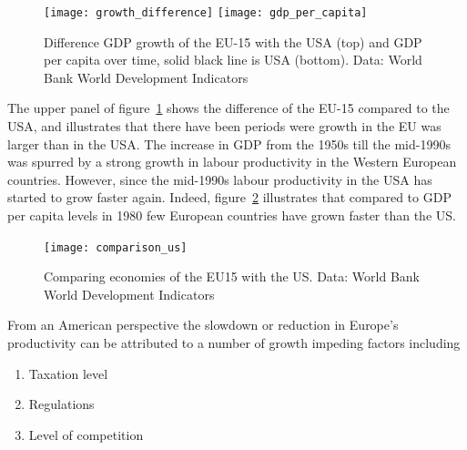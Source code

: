 \documentclass{tufte-handout}
\begin{document}
\begin{figure} \centering
    \texttt{[image: growth\_difference]}
    \texttt{[image: gdp\_per\_capita]}
    \caption{Difference GDP growth of the EU-15 with the USA (top) and GDP per capita over time, solid black line is USA (bottom). Data: World Bank World Development Indicators}
    \label{fig:growth}
  \end{figure}

The upper panel of figure~\ref{fig:growth} shows the difference of the EU-15 compared to the USA, and illustrates that there have been periods were growth in the EU was larger than in the USA. 
The increase in GDP from the 1950s till the mid-1990s was spurred by a strong growth in labour productivity in the Western European countries.
However, since the mid-1990s labour productivity in the USA has started to grow faster again. 
Indeed, figure~\ref{fig:comparison} illustrates that compared to GDP per capita levels in 1980 few European countries have grown faster than the US.
\newline
\begin{figure} \centering
    \texttt{[image: comparison\_us]}    
    \caption{Comparing economies of the EU15 with the US. Data: World Bank World Development Indicators}
    \label{fig:comparison}
  \end{figure}
From an American perspective the slowdown or reduction in Europe's productivity can be attributed to a number of growth impeding factors including
\begin{enumerate}
  \item Taxation level
  \item Regulations
  \item Level of competition
\end{enumerate}
\end{document}
